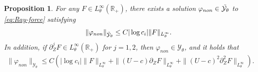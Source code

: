 \documentclass[reqno,11pt]{amsart}
\numberwithin{equation}{section}
\numberwithin{equation}{section}
\theoremstyle{plain}
\newtheorem{proposition}[theorem]{Proposition}
\begin{document}
\begin{proposition}\label{prop:ray-non2}
	For any $F\in L_\theta^{\infty}(\mathbb{R}_+)$, there exists a solution $\varphi_{non}\in \Tilde{\mathcal{Y}_\theta}$ to \eqref{eq:Ray-force} satisfying
	\begin{align}\label{eq-Ray-nonhom-tilde-Y}
		\|\varphi_{non}\|_{\Tilde{\mathcal{Y}}_\theta}\leq C|\log c_i|\|F\|_{L_\theta^\infty}.
	\end{align}
	In addition, if $\partial_Z^j F\in L_\theta^{\infty}(\mathbb{R}_+)$ for $j=1,2$, then $\varphi_{non}\in\mathcal{Y}_\theta$, and it holds that
	\begin{align}\label{eq-Ray-nonhom-Y}
		\|\varphi_{non}\|_{\mathcal{Y}_\theta}\leq C\left(|\log c_i|\|F\|_{L_\theta^\infty}+\|(U-c)\partial_ZF\|_{L_\theta^\infty}
		+\|(U-c)^2\partial_Z^2F\|_{L_\theta^\infty}\right).
	\end{align}
\end{proposition}
\end{document}
